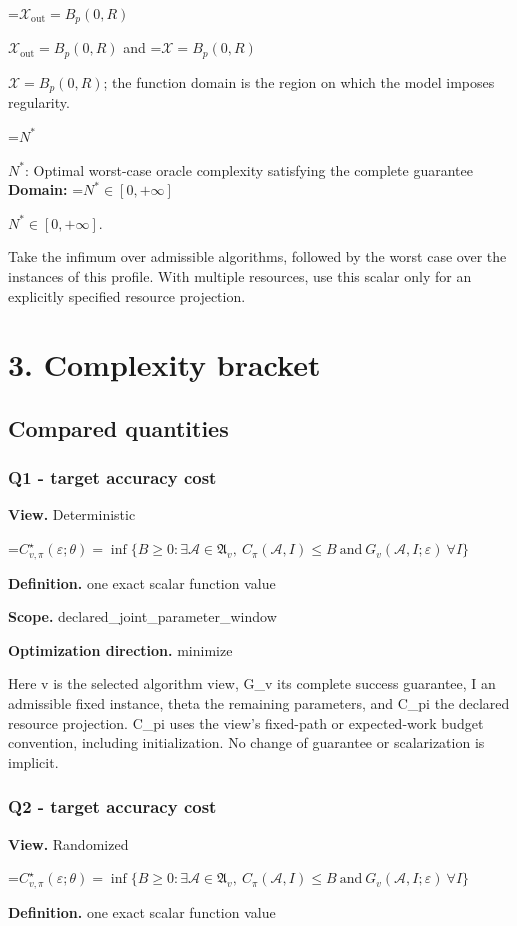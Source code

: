 \documentclass[10pt,a4paper]{article}
\newcommand{\AtlasMath}[1]{\par\begingroup\centering\setbox0=\hbox{$\displaystyle #1$}\ifdim\wd0>1.4\linewidth\typeout{ATLAS WIDE FORMULA: \the\wd0}\fi\ifdim\wd0>\linewidth\resizebox{\linewidth}{!}{\box0}\else\box0\fi\par\endgroup}
\newcommand{\AtlasInlineMath}[1]{\begingroup\setbox0=\hbox{$#1$}\ifdim\wd0>.4\linewidth\endgroup\AtlasMath{#1}\else\endgroup$#1$\fi}
\begin{document}
\AtlasInlineMath{\mathcal{X}_{\mathrm{out}}=B_p(0,R)} and \AtlasInlineMath{\mathcal{X}=B_p(0,R)}; the function domain is the region on which the model imposes regularity.

\AtlasInlineMath{N^*}: Optimal worst-case oracle complexity satisfying the complete guarantee \textbf{Domain:} \AtlasInlineMath{N^*\in[0,+\infty]}.

Take the infimum over admissible algorithms, followed by the worst case over the instances of this profile. With multiple resources, use this scalar only for an explicitly specified resource projection.

\section{3. Complexity bracket}
\subsection{Compared quantities}
\subsubsection{Q1 - target accuracy cost}
\textbf{View.} Deterministic

\AtlasMath{C^\star_{v,\pi}(\varepsilon;\theta)=\inf\{B\ge0:\exists\mathcal A\in\mathfrak A_v,\ C_\pi(\mathcal A,I)\le B\ \text{and}\ G_v(\mathcal A,I;\varepsilon)\ \forall I\}}
\textbf{Definition.} one exact scalar function value

\textbf{Scope.} declared\_joint\_parameter\_window

\textbf{Optimization direction.} minimize

Here v is the selected algorithm view, G\_v its complete success guarantee, I an admissible fixed instance, theta the remaining parameters, and C\_pi the declared resource projection. C\_pi uses the view's fixed-path or expected-work budget convention, including initialization. No change of guarantee or scalarization is implicit.

\subsubsection{Q2 - target accuracy cost}
\textbf{View.} Randomized

\AtlasMath{C^\star_{v,\pi}(\varepsilon;\theta)=\inf\{B\ge0:\exists\mathcal A\in\mathfrak A_v,\ C_\pi(\mathcal A,I)\le B\ \text{and}\ G_v(\mathcal A,I;\varepsilon)\ \forall I\}}
\textbf{Definition.} one exact scalar function value
\end{document}
